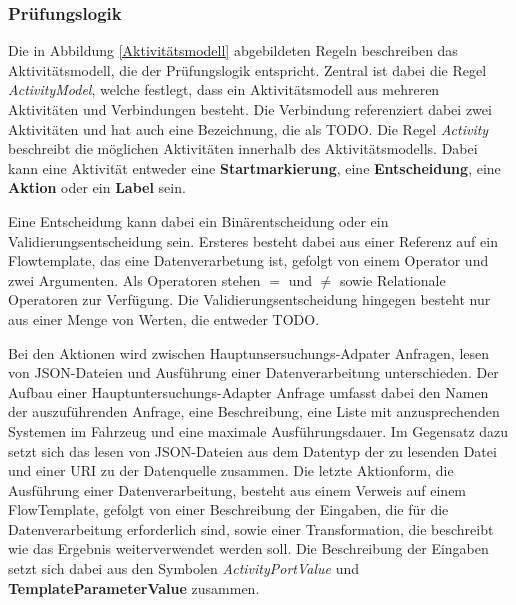     \subsubsection{Prüfungslogik}
    \label{Prüfungslogik}
    Die in Abbildung \ref{Aktivitätsmodell} abgebildeten Regeln beschreiben das Aktivitätsmodell, die der Prüfungslogik entspricht. \cite{99}
    Zentral ist dabei die Regel \textit{ActivityModel}, welche festlegt, dass ein Aktivitätsmodell aus mehreren Aktivitäten und Verbindungen besteht.
    Die Verbindung referenziert dabei zwei Aktivitäten und hat auch eine Bezeichnung, die als TODO.
    Die Regel \textit{Activity} beschreibt die möglichen Aktivitäten innerhalb des Aktivitätsmodells. 
    Dabei kann eine Aktivität entweder eine \textbf{Startmarkierung}, eine \textbf{Entscheidung}, eine \textbf{Aktion} oder ein \textbf{Label} sein.
    
    Eine Entscheidung kann dabei ein Binärentscheidung oder ein Validierungsentscheidung sein.
    Ersteres besteht dabei aus einer Referenz auf ein Flowtemplate, das eine Datenverarbetung ist, gefolgt von einem Operator und zwei Argumenten. 
    Als Operatoren stehen $=$ und $\neq$ sowie Relationale Operatoren zur Verfügung.
    Die Validierungsentscheidung hingegen besteht nur aus einer Menge von Werten, die entweder TODO.

    Bei den Aktionen wird zwischen Hauptunsersuchungs-Adpater Anfragen, lesen von JSON-Dateien und Ausführung einer Datenverarbeitung unterschieden.
    Der Aufbau einer Hauptuntersuchungs-Adapter Anfrage umfasst dabei den Namen der auszuführenden Anfrage, eine Beschreibung, eine Liste mit anzusprechenden Systemen im Fahrzeug und eine maximale Ausführungsdauer.
    Im Gegensatz dazu setzt sich das lesen von JSON-Dateien aus dem Datentyp der zu lesenden Datei und einer URI zu der Datenquelle zusammen.
    Die letzte Aktionform, die Ausführung einer Datenverarbeitung, besteht aus einem Verweis auf einem FlowTemplate, gefolgt von einer Beschreibung der Eingaben, die für die Datenverarbeitung erforderlich sind, sowie einer Transformation, die beschreibt wie das Ergebnis weiterverwendet werden soll.    
    Die Beschreibung der Eingaben setzt sich dabei aus den Symbolen \textit{ActivityPortValue} und \textbf{TemplateParameterValue} zusammen.

